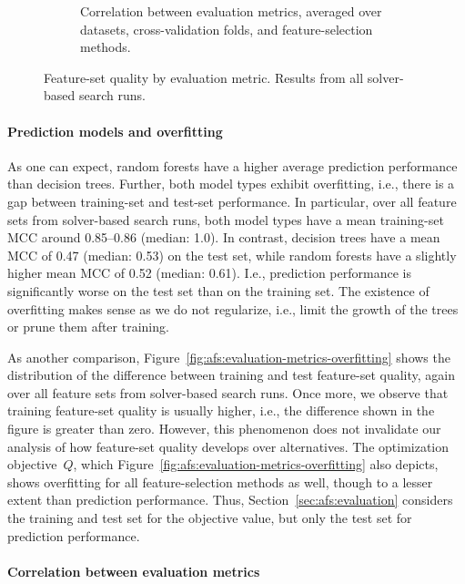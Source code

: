 \documentclass{article}
\theoremstyle{definition}
\begin{document}
\begin{figure}[t]
\begin{subfigure}[t]{0.48\textwidth}
		\caption{Correlation between evaluation metrics, averaged over datasets, cross-valida\-tion folds, and feature-selection methods.}
		\label{fig:afs:evaluation-metrics-correlation}
	\end{subfigure}
	\caption{
		Feature-set quality by evaluation metric.
		Results from all solver-based search runs.
	}
	\label{fig:afs:evaluation-metrics}
\end{figure}

\paragraph{Prediction models and overfitting}

As one can expect, random forests have a higher average prediction performance than decision trees.
Further, both model types exhibit overfitting, i.e., there is a gap between training-set and test-set performance.
In particular, over all feature sets from solver-based search runs, both model types have a mean training-set MCC around 0.85--0.86 (median: 1.0).
In contrast, decision trees have a mean MCC of 0.47 (median: 0.53) on the test set, while random forests have a slightly higher mean MCC of 0.52 (median: 0.61).
I.e., prediction performance is significantly worse on the test set than on the training set.
The existence of overfitting makes sense as we do not regularize, i.e., limit the growth of the trees or prune them after training.

As another comparison, Figure~\ref{fig:afs:evaluation-metrics-overfitting} shows the distribution of the difference between training and test feature-set quality, again over all feature sets from solver-based search runs.
Once more, we observe that training feature-set quality is usually higher, i.e., the difference shown in the figure is greater than zero.
However, this phenomenon does not invalidate our analysis of how feature-set quality develops over alternatives.
The optimization objective~$Q$, which Figure~\ref{fig:afs:evaluation-metrics-overfitting} also depicts, shows overfitting for all feature-selection methods as well, though to a lesser extent than prediction performance.
Thus, Section~\ref{sec:afs:evaluation} considers the training and test set for the objective value, but only the test set for prediction performance.

\paragraph{Correlation between evaluation metrics}
\end{document}
